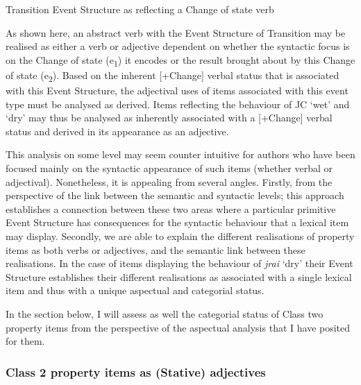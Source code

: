 Transition Event Structure as reflecting a Change of state verb 
\begin{center}\end{center}
\z

As shown here, an abstract verb with the Event Structure of Transition may be realised as either a verb or adjective dependent on whether the syntactic focus is on the Change of state (e\textsubscript{1}) it encodes or the result brought about by this Change of state (e\textsubscript{2}). Based on the inherent [+Change] verbal status that is associated with this Event Structure, the adjectival uses of items associated with this event type must be analysed as derived. Items reflecting the behaviour of JC `wet' and `dry' may thus be analysed as inherently associated with a [+Change] verbal status and derived in its appearance as an adjective.

This analysis on some level may seem counter intuitive for authors who have been focused mainly on the syntactic appearance of such items (whether verbal or adjectival). Nonetheless, it is appealing from several angles. Firstly, from the perspective of the link between the semantic and syntactic levels; this approach establishes a connection between these two areas where a particular primitive Event Structure has consequences for the syntactic behaviour that a lexical item may display. Secondly, we are able to explain the different realisations of property items as both verbs or adjectives, and the semantic link between these realisations. In the case of items displaying the behaviour of \textit{jrai} `dry' their Event Structure establishes their different realisations as associated with a single lexical item and thus with a unique aspectual and categorial status. 

In the section below, I will assess as well the categorial status of Class two property items from the perspective of the aspectual analysis that I have posited for them. 

\subsubsection{Class 2 property items as (Stative) adjectives}\label{sec:6.1.1.2}

